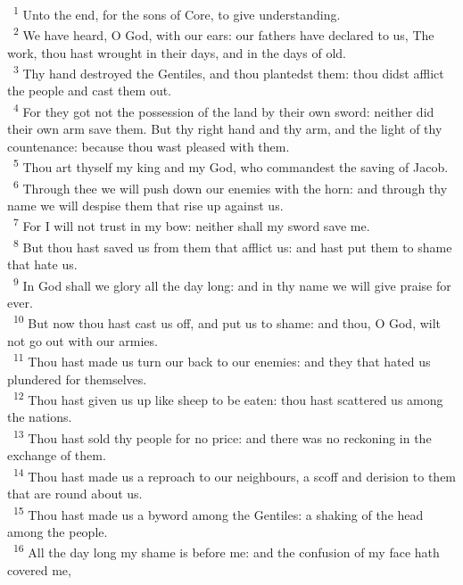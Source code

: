 \documentclass[a5paper,12pt]{article}
\begin{document}
\begin{multicols*}{2}
~\textsuperscript{1} Unto the end, for the sons of Core, to give understanding.\\
~\textsuperscript{2} We have heard, O God, with our ears: our fathers have declared to us, The work, thou hast wrought in their days, and in the days of old.\\
~\textsuperscript{3} Thy hand destroyed the Gentiles, and thou plantedst them: thou didst afflict the people and cast them out.\\
~\textsuperscript{4} For they got not the possession of the land by their own sword: neither did their own arm save them. But thy right hand and thy arm, and the light of thy countenance: because thou wast pleased with them.\\
~\textsuperscript{5} Thou art thyself my king and my God, who commandest the saving of Jacob.\\
~\textsuperscript{6} Through thee we will push down our enemies with the horn: and through thy name we will despise them that rise up against us.\\
~\textsuperscript{7} For I will not trust in my bow: neither shall my sword save me.\\
~\textsuperscript{8} But thou hast saved us from them that afflict us: and hast put them to shame that hate us.\\
~\textsuperscript{9} In God shall we glory all the day long: and in thy name we will give praise for ever.\\
~\textsuperscript{10} But now thou hast cast us off, and put us to shame: and thou, O God, wilt not go out with our armies.\\
~\textsuperscript{11} Thou hast made us turn our back to our enemies: and they that hated us plundered for themselves.\\
~\textsuperscript{12} Thou hast given us up like sheep to be eaten: thou hast scattered us among the nations.\\
~\textsuperscript{13} Thou hast sold thy people for no price: and there was no reckoning in the exchange of them.\\
~\textsuperscript{14} Thou hast made us a reproach to our neighbours, a scoff and derision to them that are round about us.\\
~\textsuperscript{15} Thou hast made us a byword among the Gentiles: a shaking of the head among the people.\\
~\textsuperscript{16} All the day long my shame is before me: and the confusion of my face hath covered me,\\

\end{multicols*}
\end{document}
